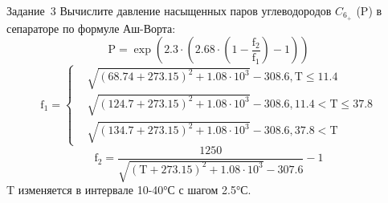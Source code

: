 \documentclass[aspectratio=169]{beamer}	%
\begin{document}
\begin{frame}[fragile]{Задание~3}
\large
Вычислите давление насыщенных паров углеводородов $C_{6_{+}}$ (P) в сепараторе по формуле Аш-Ворта:
\begin{equation*}
	\mathrm{P = \exp \left(2.3 \cdot \left(2.68 \cdot \left(1 - \dfrac{f_2}{f_1}\right)-1\right)\right)}
\end{equation*}
\begin{equation*}
\mathrm{
	f_1 = \left\{
	\begin{aligned}
		& \mathrm{\sqrt{\left(68.74 + 273.15\right)^2 + 1.08 \cdot 10^3} - 308.6, T \leqslant 11.4} \\
		& \mathrm{\sqrt{\left(124.7 + 273.15\right)^2 + 1.08 \cdot 10^3} - 308.6, 11.4 < T \leqslant 37.8} \\
		& \mathrm{\sqrt{\left(134.7 + 273.15\right)^2 + 1.08 \cdot 10^3} - 308.6,  37.8 < T}
	\end{aligned}
	\right.}
\end{equation*}
\begin{equation*}
\mathrm{
	f_2 = \dfrac{1250}{\sqrt{\left(T+273.15\right)^2 + 1.08 \cdot 10^3} - 307.6} - 1
}
\end{equation*}
T изменяется в интервале 10-40°С с шагом 2.5°С.
\vfill
\end{frame}


\end{document}
